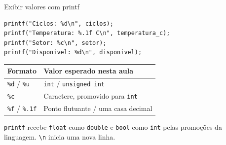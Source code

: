 \begin{frame}[fragile]{Exibir valores com printf}
\begin{lstlisting}
printf("Ciclos: %d\n", ciclos);
printf("Temperatura: %.1f C\n", temperatura_c);
printf("Setor: %c\n", setor);
printf("Disponivel: %d\n", disponivel);
\end{lstlisting}
\small
\begin{tabularx}{\textwidth}{lX}
\toprule
Formato & Valor esperado nesta aula \\
\midrule
\texttt{\%d} / \texttt{\%u} & \texttt{int} / \texttt{unsigned int} \\
\texttt{\%c} & Caractere, promovido para \texttt{int} \\
\texttt{\%f} / \texttt{\%.1f} & Ponto flutuante / uma casa decimal \\
\bottomrule
\end{tabularx}
\medskip
\texttt{printf} recebe \texttt{float} como \texttt{double} e \texttt{bool} como \texttt{int} pelas promoções da linguagem. \texttt{\textbackslash n} inicia uma nova linha.
\end{frame}
